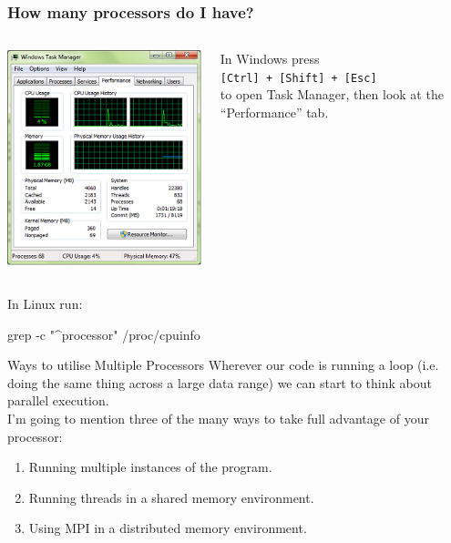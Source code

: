 \documentclass[smaller,handout,table]{beamer}
\begin{document}
\begin{frame}[fragile]
\frametitle{How many processors do I have?}
\begin{block}{}
\begin{columns}
\begin{column}{4cm}
\includegraphics[width=\textwidth]{taskman.png}
\end{column}
\begin{column}{6cm}
In Windows press \\\texttt{[Ctrl] + [Shift] + [Esc]} \\to open Task Manager, then look at the ``Performance'' tab.
\end{column}
\end{columns}
\end{block}
\begin{block}{}
In Linux run:
\begin{semiverbatim}
grep -c "^processor" /proc/cpuinfo
\end{semiverbatim}
\end{block}
\end{frame}

\begin{frame}{Ways to utilise Multiple Processors}
Wherever our code is running a loop (i.e. doing the same thing across a large data range) we can start to think about parallel execution.\\
I'm going to mention three of the many ways to take full advantage of your processor:
\begin{enumerate}
\item Running multiple instances of the program.
\item Running threads in a shared memory environment.
\item Using MPI in a distributed memory environment.
\end{enumerate}
\end{frame}
\end{document}
